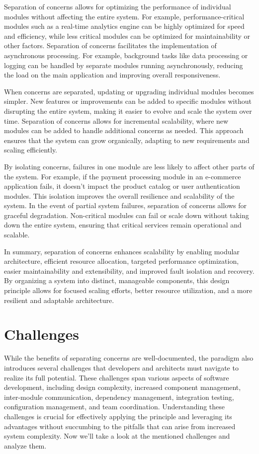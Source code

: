 \par
Separation of concerns allows for optimizing the performance of individual modules without affecting the entire system.
For example, performance-critical modules such as a real-time analytics engine can be highly optimized for speed and efficiency, while less critical modules can be optimized for maintainability or other factors.
Separation of concerns facilitates the implementation of asynchronous processing.
For example, background tasks like data processing or logging can be handled by separate modules running asynchronously, reducing the load on the main application and improving overall responsiveness.
\par
When concerns are separated, updating or upgrading individual modules becomes simpler.
New features or improvements can be added to specific modules without disrupting the entire system, making it easier to evolve and scale the system over time.
Separation of concerns allows for incremental scalability, where new modules can be added to handle additional concerns as needed.
This approach ensures that the system can grow organically, adapting to new requirements and scaling efficiently.
\par
By isolating concerns, failures in one module are less likely to affect other parts of the system.
For example, if the payment processing module in an e-commerce application fails, it doesn't impact the product catalog or user authentication modules.
This isolation improves the overall resilience and scalability of the system.
In the event of partial system failures, separation of concerns allows for graceful degradation.
Non-critical modules can fail or scale down without taking down the entire system, ensuring that critical services remain operational and scalable.
\par
In summary, separation of concerns enhances scalability by enabling modular architecture, efficient resource allocation, targeted performance optimization, easier maintainability and extensibility, and improved fault isolation and recovery.
By organizing a system into distinct, manageable components, this design principle allows for focused scaling efforts, better resource utilization, and a more resilient and adaptable architecture.


\section{Challenges}
While the benefits of separating concerns are well-documented, the paradigm also introduces several challenges that developers and architects must navigate to realize its full potential.
These challenges span various aspects of software development, including design complexity, increased component management, inter-module communication, dependency management, integration testing, configuration management, and team coordination.
Understanding these challenges is crucial for effectively applying the principle and leveraging its advantages without succumbing to the pitfalls that can arise from increased system complexity.
Now we'll take a look at the mentioned challenges and analyze them.

